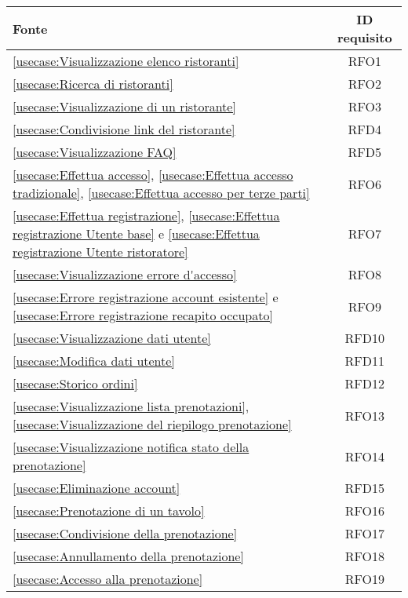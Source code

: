 \begin{longtable}{|l|c|}
    \hline
    \textbf{Fonte} & \textbf{ ID requisito} \\
    \hline
    \autoref{usecase:Visualizzazione elenco ristoranti} & RFO1 \\
    \hline
    \autoref{usecase:Ricerca di ristoranti} & RFO2 \\
    \hline
    \autoref{usecase:Visualizzazione di un ristorante} & RFO3 \\
    \hline
    \autoref{usecase:Condivisione link del ristorante} & RFD4 \\
    \hline
    \autoref{usecase:Visualizzazione FAQ} & RFD5 \\
    \hline
    \autoref{usecase:Effettua accesso}, \autoref{usecase:Effettua accesso tradizionale}, \autoref{usecase:Effettua accesso per terze parti} & RFO6 \\
    \hline
    \autoref{usecase:Effettua registrazione}, \autoref{usecase:Effettua registrazione Utente base} e \autoref{usecase:Effettua registrazione Utente ristoratore} & RFO7 \\
    \hline
    \autoref{usecase:Visualizzazione errore d'accesso} & RFO8 \\
    \hline
    \autoref{usecase:Errore registrazione account esistente} e \autoref{usecase:Errore registrazione recapito occupato} & RFO9 \\
    \hline
    \autoref{usecase:Visualizzazione dati utente} & RFD10 \\
    \hline
    \autoref{usecase:Modifica dati utente} & RFD11 \\
    \hline
    \autoref{usecase:Storico ordini} & RFD12 \\
    \hline
    \autoref{usecase:Visualizzazione lista prenotazioni}, \autoref{usecase:Visualizzazione del riepilogo prenotazione} & RFO13 \\
    \hline
    \autoref{usecase:Visualizzazione notifica stato della prenotazione} & RFO14 \\
    \hline
    \autoref{usecase:Eliminazione account} & RFD15 \\
    \hline
    \autoref{usecase:Prenotazione di un tavolo} & RFO16 \\
    \hline
    \autoref{usecase:Condivisione della prenotazione} & RFO17 \\
    \hline
    \autoref{usecase:Annullamento della prenotazione} & RFO18 \\
    \hline
    \autoref{usecase:Accesso alla prenotazione} & RFO19 \\

\end{longtable}
